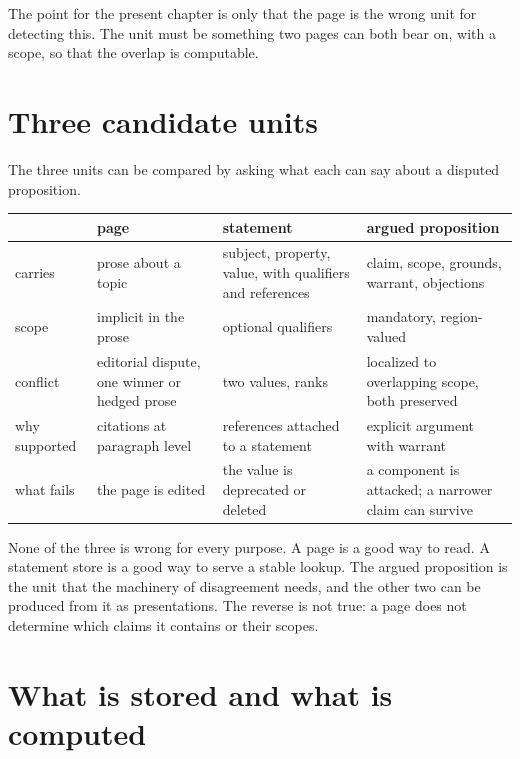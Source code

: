 The point for the present chapter is only that the page is the wrong unit for detecting this. The unit must be something two pages can both bear on, with a scope, so that the overlap is computable.

\section{Three candidate units}\label{sec:units}

The three units can be compared by asking what each can say about a disputed proposition.

\begin{center}
\small
\begin{tabularx}{\textwidth}{@{}l X X X@{}}
\toprule
 & page & statement & argued proposition\\
\midrule
carries & prose about a topic & subject, property, value, with qualifiers and references & claim, scope, grounds, warrant, objections\\
scope & implicit in the prose & optional qualifiers & mandatory, region-valued\\
conflict & editorial dispute, one winner or hedged prose & two values, ranks & localized to overlapping scope, both preserved\\
why supported & citations at paragraph level & references attached to a statement & explicit argument with warrant\\
what fails & the page is edited & the value is deprecated or deleted & a component is attacked; a narrower claim can survive\\
\bottomrule
\end{tabularx}
\end{center}

None of the three is wrong for every purpose. A page is a good way to read. A statement store is a good way to serve a stable lookup. The argued proposition is the unit that the machinery of disagreement needs, and the other two can be produced from it as presentations. The reverse is not true: a page does not determine which claims it contains or their scopes.

\section{What is stored and what is computed}\label{sec:stored}

